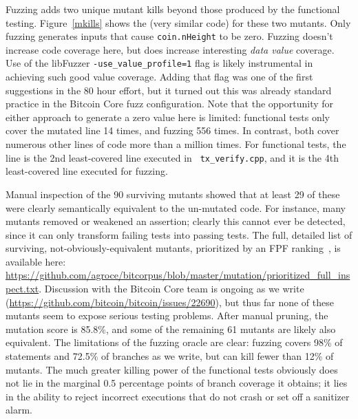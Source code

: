 Fuzzing adds two unique mutant kills beyond those produced by
the functional testing.  Figure~\ref{mkills} shows the (very similar
code) for these two mutants.  Only fuzzing generates inputs that cause
{\tt coin.nHeight} to be zero.  Fuzzing doesn't increase code coverage
here, but does increase interesting \emph{data value} coverage.  Use
of the libFuzzer {\tt -use\_value\_profile=1} flag is likely
instrumental in achieving such good value coverage.  Adding that flag was
one of the first suggestions in the 80 hour effort, but it turned out
this was already standard practice in the Bitcoin Core fuzz
configuration.  Note that the opportunity for either approach to
generate a zero value here is limited: functional tests only cover the
mutated line 14 times, and fuzzing 556 times.  In contrast, both cover
numerous other lines of code more than a million times.  For
functional tests, the line is the 2nd least-covered line executed in {\tt
  tx\_verify.cpp}, and it is the 4th least-covered line executed for fuzzing.

Manual inspection of the 90 surviving mutants showed that at
least 29 of these were clearly semantically equivalent to the
un-mutated code.  For instance, many mutants removed or weakened an
assertion; clearly this cannot ever be detected, since it can only
transform failing tests into passing tests.  The full, detailed list
of surviving, not-obviously-equivalent mutants, prioritized by an FPF ranking~\cite{10.1145/2491956.2462173,Gonzalez85}, is
available here:
\url{https://github.com/agroce/bitcorpus/blob/master/mutation/prioritized_full_inspect.txt}.
Discussion with the Bitcoin Core team is ongoing as we write
(\url{https://github.com/bitcoin/bitcoin/issues/22690}), but thus far
none of these mutants seem to expose serious testing
problems.  After manual pruning, the mutation score is 85.8\%, and
some of the remaining 61 mutants are likely also equivalent.  The
limitations of the fuzzing oracle are clear: fuzzing covers 98\% of
statements and 72.5\% of branches as we write, but can kill fewer than
12\% of mutants.  The much greater killing power of the functional
tests obviously does not lie in the marginal 0.5
percentage points of  branch coverage it obtains; it lies
in the ability to reject incorrect executions that do not crash or set
off a sanitizer alarm.

